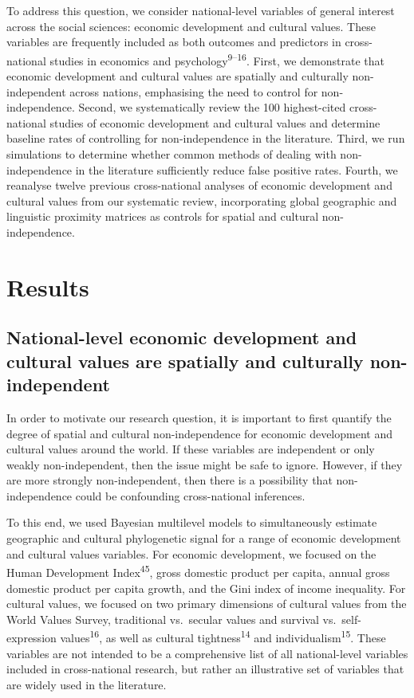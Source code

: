 \documentclass[
  man,floatsintext]{apa6}
\begin{document}
To address this question, we consider national-level variables of general interest across the social sciences: economic development and cultural values. These variables are frequently included as both outcomes and predictors in cross-national studies in economics and psychology\textsuperscript{9--16}. First, we demonstrate that economic development and cultural values are spatially and culturally non-independent across nations, emphasising the need to control for non-independence. Second, we systematically review the 100 highest-cited cross-national studies of economic development and cultural values and determine baseline rates of controlling for non-independence in the literature. Third, we run simulations to determine whether common methods of dealing with non-independence in the literature sufficiently reduce false positive rates. Fourth, we reanalyse twelve previous cross-national analyses of economic development and cultural values from our systematic review, incorporating global geographic and linguistic proximity matrices as controls for spatial and cultural non-independence.

\hypertarget{results}{%
\section{Results}\label{results}}

\hypertarget{national-level-economic-development-and-cultural-values-are-spatially-and-culturally-non-independent}{%
\subsection{National-level economic development and cultural values are spatially and culturally non-independent}\label{national-level-economic-development-and-cultural-values-are-spatially-and-culturally-non-independent}}

In order to motivate our research question, it is important to first quantify the degree of spatial and cultural non-independence for economic development and cultural values around the world. If these variables are independent or only weakly non-independent, then the issue might be safe to ignore. However, if they are more strongly non-independent, then there is a possibility that non-independence could be confounding cross-national inferences.

To this end, we used Bayesian multilevel models to simultaneously estimate geographic and cultural phylogenetic signal for a range of economic development and cultural values variables. For economic development, we focused on the Human Development Index\textsuperscript{45}, gross domestic product per capita, annual gross domestic product per capita growth, and the Gini index of income inequality. For cultural values, we focused on two primary dimensions of cultural values from the World Values Survey, traditional vs.~secular values and survival vs.~self-expression values\textsuperscript{16}, as well as cultural tightness\textsuperscript{14} and individualism\textsuperscript{15}. These variables are not intended to be a comprehensive list of all national-level variables included in cross-national research, but rather an illustrative set of variables that are widely used in the literature.
\end{document}

